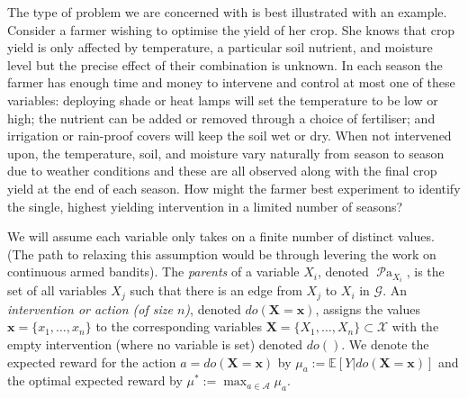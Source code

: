 \documentclass[11pt,a4paper,oneside]{book}
\newcommand{\actions}{\mathcal{A}}
\newcommand{\E}[1]{\mathbb E\left[{#1}\right]}
\newcommand{\parents}[1]{\operatorname{\mathcal{P}a}_{#1}}
\renewcommand{\vec}[1]{\boldsymbol{#1}}
\theoremstyle{plain}
\theoremstyle{definition}
\begin{document}
The type of problem we are concerned with is best illustrated with an example. Consider a farmer wishing to optimise the yield of her crop. She knows that crop yield is only affected by temperature, a particular soil nutrient, and moisture level but the precise effect of their combination is unknown. In each season the farmer has enough time and money to intervene and control at most one of these
variables: deploying shade or heat lamps will set the temperature to be low or high; the nutrient can be added or removed through a choice of fertiliser; and irrigation or rain-proof covers will keep the soil wet or dry. When not intervened upon, the temperature, soil, and moisture vary naturally from season to season due to weather conditions and these are all observed along with the final crop yield at the end of each season. How might the farmer best experiment to identify the single, highest yielding intervention in a limited number of seasons?

We will assume each variable only takes on a finite number of distinct values. (The path to relaxing this assumption would be through levering the work on continuous armed bandits). The \emph{parents} of a variable $X_i$, denoted $\parents{X_i}$, is the set of all variables $X_j$ such that there is an edge from $X_j$ to $X_i$ in $\mathcal{G}$. An \emph{intervention or action (of size $n$)}, denoted $do(\vec{X}=\vec{x})$, assigns the values $\vec{x}=\{x_1, \ldots, x_n\}$ to the corresponding variables $\vec{X}=\{X_1, \ldots, X_n\} \subset \mathcal{X}$ with the empty intervention (where no variable is set) denoted $do()$. We denote the expected reward for the action $a = do(\vec{X} = \vec{x})$ by $\mu_{a} := \E{Y | do(\vec{X} = \vec{x})}$ and 
the optimal expected reward by $\mu^* := \max_{a\in\actions} \mu_{a}$. 
\end{document}
